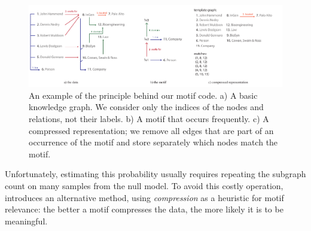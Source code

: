 \documentclass[runningheads]{style/llncs}
\newcommand{\G}{{\cal G}}
\begin{document}

\begin{figure}[bth]
  \centering
    \includegraphics[width=\textwidth]{example.pdf}
    \caption{An example of the principle behind our motif code. a) A basic knowledge graph. We consider only the indices of the nodes and relations, not their labels. b) A motif that occurs frequently. c) A compressed representation; we remove all edges that are part of an occurrence of the motif and store separately which nodes match the motif.}
    \label{figure:example}
  \label{figure:codes}
\end{figure}

Unfortunately, estimating this probability usually requires repeating the subgraph count on many samples from the null model. To avoid this costly operation, \cite{bloem2017large} introduces  an alternative method, using \emph{compression} as a heuristic for motif relevance: the better a motif compresses the data, the more likely it is to be meaningful. 


\end{document}
